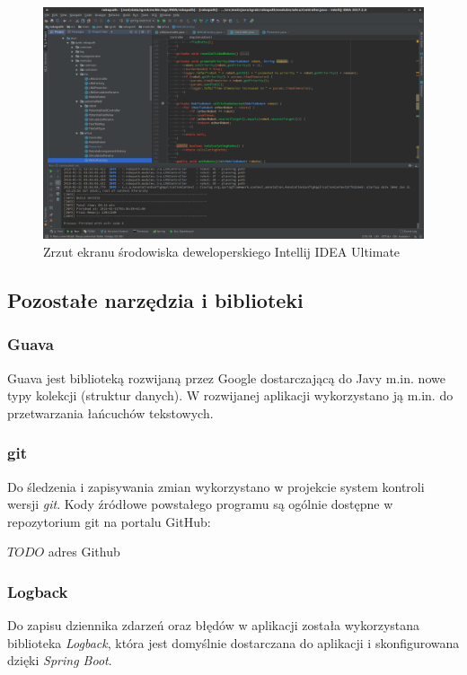 \begin{figure}
	\centering
	\includegraphics[width=0.9\columnwidth]{img/robopath/intellij}
	\caption{Zrzut ekranu środowiska deweloperskiego Intellij IDEA Ultimate}
	\label{fig:app-tech-intellij}
\end{figure}

\subsection{Pozostałe narzędzia i biblioteki}
\subsubsection{Guava}
Guava jest biblioteką rozwijaną przez Google dostarczającą do Javy m.in. nowe typy kolekcji (struktur danych). W rozwijanej aplikacji wykorzystano ją m.in. do przetwarzania łańcuchów tekstowych.
\subsubsection{git}
Do śledzenia i zapisywania zmian wykorzystano w projekcie system kontroli wersji {\it git}.
Kody źródłowe powstałego programu są ogólnie dostępne w repozytorium git na portalu GitHub:

$TODO$ adres Github
\subsubsection{Logback}
Do zapisu dziennika zdarzeń oraz błędów w aplikacji została wykorzystana biblioteka {\it Logback}, która jest domyślnie dostarczana do aplikacji i skonfigurowana dzięki {\it Spring Boot}.


